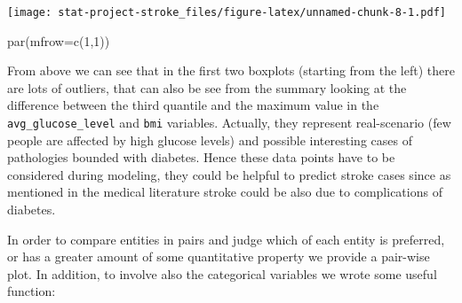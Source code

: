 \documentclass[
]{article}
\newenvironment{Shaded}{\begin{snugshade}}{\end{snugshade}}
\newcommand{\AttributeTok}[1]{\textcolor[rgb]{0.77,0.63,0.00}{#1}}
\newcommand{\DecValTok}[1]{\textcolor[rgb]{0.00,0.00,0.81}{#1}}
\newcommand{\FunctionTok}[1]{\textcolor[rgb]{0.00,0.00,0.00}{#1}}
\newcommand{\NormalTok}[1]{#1}
\begin{document}
\texttt{[image: stat-project-stroke\_files/figure-latex/unnamed-chunk-8-1.pdf]}

\begin{Shaded}
\begin{Highlighting}[]
\FunctionTok{par}\NormalTok{(}\AttributeTok{mfrow=}\FunctionTok{c}\NormalTok{(}\DecValTok{1}\NormalTok{,}\DecValTok{1}\NormalTok{))}
\end{Highlighting}
\end{Shaded}

From above we can see that in the first two boxplots (starting from the
left) there are lots of outliers, that can also be see from the summary
looking at the difference between the third quantile and the maximum
value in the \texttt{avg\_glucose\_level} and \texttt{bmi} variables.
Actually, they represent real-scenario (few people are affected by high
glucose levels) and possible interesting cases of pathologies bounded
with diabetes. Hence these data points have to be considered during
modeling, they could be helpful to predict stroke cases since as
mentioned in the medical literature stroke could be also due to
complications of diabetes.

In order to compare entities in pairs and judge which of each entity is
preferred, or has a greater amount of some quantitative property we
provide a pair-wise plot. In addition, to involve also the categorical
variables we wrote some useful function:
\end{document}
